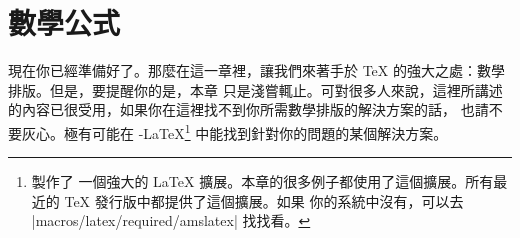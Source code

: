 
\chapter{數學公式}

\begin{intro}
現在你已經準備好了。那麼在這一章裡，讓我們來著手於 \TeX{} 的強大之處：數學排版。但是，要提醒你的是，本章
只是淺嘗輒止。可對很多人來說，這裡所講述的內容已很受用，如果你在這裡找不到你所需數學排版的解決方案的話，
也請不要灰心。極有可能在 \AmS-\LaTeX{}\footnote{ 製作了
一個強大的 \LaTeX{} 擴展。本章的很多例子都使用了這個擴展。所有最近的 \TeX{} 發行版中都提供了這個擴展。如果
你的系統中沒有，可以去 \CTANref|macros/latex/required/amslatex| 找找看。} 中能找到針對你的問題的某個解決方案。


\end{intro}



